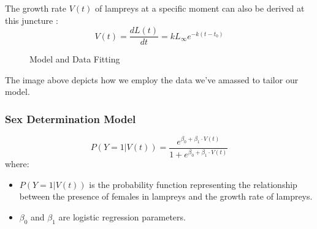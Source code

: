 \documentclass[12pt]{article}  %
\begin{document}
The growth rate $V(t)$ of lampreys at a specific moment can also be derived at this juncture :
\begin{equation}
	V(t)=\frac{dL\left( t \right)}{dt}=kL_{\infty}e^{-k\left( t-t_0 \right)}
\end{equation}
\begin{figure}[H]
	\centering    
	
	\caption{Model and Data Fitting} %
\end{figure}

The image above depicts how we employ the data we've amassed to tailor our model.
\subsubsection{Sex Determination Model }

\begin{equation}
	P\left( \left. Y=1 \right|V\left( t \right) \right) =\frac{e^{\beta _0+\beta _1\cdot V\left( t \right)}}{1+e^{\beta _0+\beta _1\cdot V\left( t \right)}}
\end{equation}
where:
\begin{itemize}
	\setlength{\parsep}{0ex} %
	\setlength{\topsep}{2ex} %
	\setlength{\itemsep}{1ex} %
	\item $P\left( \left. Y=1 \right|V\left( t \right) \right)$ is the probability function representing the relationship between the presence of females in lampreys and the growth rate of lampreys.
	\item $\beta_{0}$ and $\beta_{1}$ are logistic regression parameters.
\end{itemize}
\end{document}
